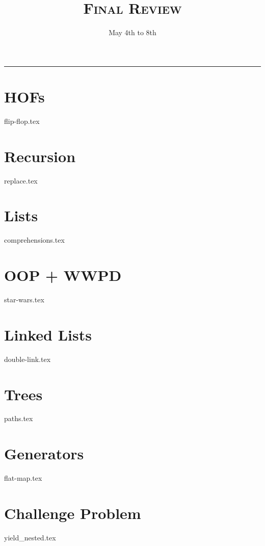 \documentclass{exam}
\title{\textsc{Final Review}}
\date{May 4th to 8th}
\begin{document}
\maketitle
\rule{\textwidth}{0.15em}
\fontsize{12}{15}\selectfont


\begin{questions}

\section{HOFs}
{flip-flop.tex}
\newpage

\section{Recursion}
{replace.tex}
\newpage

\section{Lists}
{comprehensions.tex}
\newpage

\section{OOP + WWPD}
{star-wars.tex}
\newpage

\section{Linked Lists}
{double-link.tex}
\newpage

\section{Trees}
{paths.tex}
\newpage

\section{Generators}
{flat-map.tex}
\newpage
\section{Challenge Problem}
{yield_nested.tex}
\newpage 
\end{questions}
\end{document}
